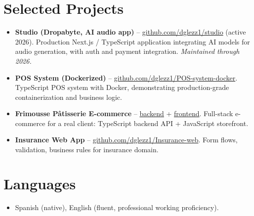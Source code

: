 \documentclass[11pt,a4paper,sans]{moderncv}
\begin{document}

\section{Selected Projects}
\vspace{1pt}
\begin{itemize}
\item{\textbf{Studio (Dropabyte, AI audio app)} -- \href{https://github.com/dglezz1/studio}{github.com/dglezz1/studio} (active 2026). Production Next.js / TypeScript application integrating AI models for audio generation, with auth and payment integration. \emph{Maintained through 2026.}}
\item{\textbf{POS System (Dockerized)} -- \href{https://github.com/dglezz1/POS-system-docker}{github.com/dglezz1/POS-system-docker}. TypeScript POS system with Docker, demonstrating production-grade containerization and business logic.}
\item{\textbf{Frimousse Pâtisserie E-commerce} -- \href{https://github.com/dglezz1/frimousse-backend}{backend} + \href{https://github.com/dglezz1/frimousse-frontend}{frontend}. Full-stack e-commerce for a real client: TypeScript backend API + JavaScript storefront.}
\item{\textbf{Insurance Web App} -- \href{https://github.com/dglezz1/Insurance-web}{github.com/dglezz1/Insurance-web}. Form flows, validation, business rules for insurance domain.}
\end{itemize}


\section{Languages}
\vspace{1pt}
\begin{itemize}
\item Spanish (native), English (fluent, professional working proficiency).
\end{itemize}

\end{document}
